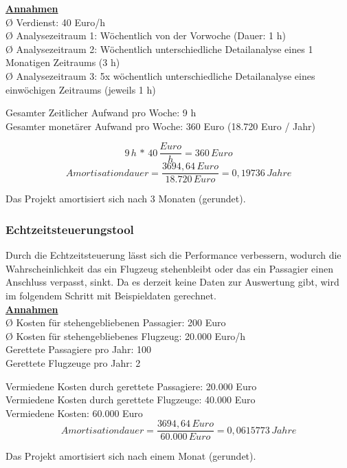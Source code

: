 	{
		\noindent
		\underline{\textbf{Annahmen}}\\
		Ø Verdienst: 40 Euro/h\\
		Ø Analysezeitraum 1: Wöchentlich von der Vorwoche (Dauer: 1 h)\\
		Ø Analysezeitraum 2: Wöchentlich unterschiedliche Detailanalyse eines 1 Monatigen Zeitraums (3 h)\\
		Ø Analysezeitraum 3: 5x wöchentlich unterschiedliche Detailanalyse eines einwöchigen Zeitraums (jeweils 1 h)\\

	}

	{
		\noindent
		Gesamter Zeitlicher Aufwand pro Woche: 9 h\\
		Gesamter monetärer Aufwand pro Woche: 360 Euro (18.720 Euro / Jahr)

		\[ 9\,h\,*\,40\,\frac{Euro}{h} = 360\,Euro \]
		\[ Amortisationdauer = \frac{3694,64\,Euro}{18.720\,Euro} = 0,19736\,Jahre \]

		Das Projekt amortisiert sich nach 3 Monaten (gerundet).

	}

	
	\subsubsection{Echtzeitsteuerungstool}

	{
		Durch die Echtzeitsteuerung lässt sich die Performance verbessern, wodurch die Wahrscheinlichkeit das ein Flugzeug stehenbleibt oder das ein Passagier einen Anschluss verpasst, sinkt. Da es derzeit keine Daten zur Auswertung gibt, wird im folgendem Schritt mit Beispieldaten gerechnet.\\
		\noindent
		\underline{\textbf{Annahmen}}\\
		Ø Kosten für stehengebliebenen Passagier: 200 Euro\\
		Ø Kosten für stehengebliebenes Flugzeug: 20.000 Euro/h\\
		Gerettete Passagiere pro Jahr: 100\\
		Gerettete Flugzeuge pro Jahr: 2\\

	}

	{
		\noindent
		Vermiedene Kosten durch gerettete Passagiere: 20.000 Euro\\
		Vermiedene Kosten durch gerettete Flugzeuge: 40.000 Euro\\
		Vermiedene Kosten: 60.000 Euro\\

		\[ Amortisationdauer = \frac{3694,64\,Euro}{60.000\,Euro} = 0,0615773\,Jahre \]

		Das Projekt amortisiert sich nach einem Monat (gerundet).

	}